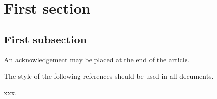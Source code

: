 \documentclass[mlq,fleqn]{w-art}
\begin{document}




\section{First section}
\subsection{First subsection}




\begin{acknowledgement}
  An acknowledgement may be placed at the end of the article.
\end{acknowledgement}

The style of the following references should be used in all documents.

\begin{thebibliography}{10}
 xxx.
\end{thebibliography}
\end{document}
